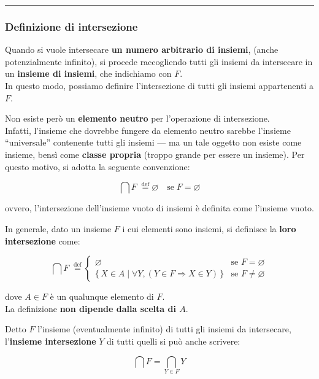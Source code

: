 \documentclass[
  a4paper,
]{article}
\begin{document}
\par\noindent\rule{\linewidth}{0.4pt}\par\vspace{6pt}

\hypertarget{definizione-di-intersezione}{%
\subsubsection{Definizione di
intersezione}\label{definizione-di-intersezione}}

Quando si vuole intersecare \textbf{un numero arbitrario di insiemi},
(anche potenzialmente infinito), si procede raccogliendo tutti gli
insiemi da intersecare in un \textbf{insieme di insiemi}, che indichiamo
con \(F\).\\
In questo modo, possiamo definire l'intersezione di tutti gli insiemi
appartenenti a \(F\).

Non esiste però un \textbf{elemento neutro} per l'operazione di
intersezione.\\
Infatti, l'insieme che dovrebbe fungere da elemento neutro sarebbe
l'insieme ``universale'' contenente tutti gli insiemi --- ma un tale
oggetto non esiste come insieme, bensì come \textbf{classe propria}
(troppo grande per essere un insieme). Per questo motivo, si adotta la
seguente convenzione:

\[
\bigcap F \;\overset{\mathrm{def}}{=} \varnothing \quad \text{se} \; F = \varnothing
\]

ovvero, l'intersezione dell'insieme vuoto di insiemi è definita come
l'insieme vuoto.

In generale, dato un insieme \(F\) i cui elementi sono insiemi, si
definisce la \textbf{loro intersezione} come:

\[
\bigcap F \; \overset{\mathrm{def}}{=} \begin{cases} \varnothing & \text{se } F = \varnothing \\ \{\, X \in A \mid \forall Y, (Y \in F \Rightarrow X \in Y) \,\} & \text{se } F \neq \varnothing \end{cases}
\]

dove \(A \in F\) è un qualunque elemento di \(F\).\\
La definizione \textbf{non dipende dalla scelta di \(A\)}.

Detto \(F\) l'insieme (eventualmente infinito) di tutti gli insiemi da
intersecare, l'\textbf{insieme intersezione} \(Y\) di tutti quelli si
può anche scrivere:

\[
\bigcap F = \bigcap_{Y \in F} Y
\]
\end{document}

